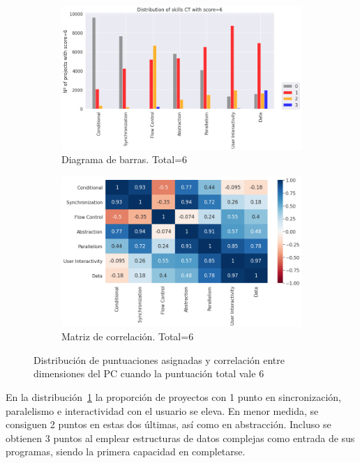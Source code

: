 \documentclass[a4paper, 12pt]{book}
\begin{document}
\begin{figure}[H]
    \centering
    \begin{subfigure}[h]{.49\textwidth} 
        \includegraphics[width=\textwidth]{img/distribucion_6_Snap}
        \caption{Diagrama de barras. Total=6}
        \label{fig:total6_Snap}
    \end{subfigure}       
    \begin{subfigure}[h]{.49\textwidth} 
        \includegraphics[width=\textwidth]{img/corr_6_Snap}
        \caption{Matriz de correlación. Total=6}
        \label{fig:corr6_Snap}
    \end{subfigure}
    \caption{Distribución de puntuaciones asignadas y correlación entre dimensiones del PC cuando la puntuación total vale 6}
\end{figure}

En la distribución~\ref{fig:total6_Snap} la proporción de proyectos con 1 punto en sincronización, paralelismo e interactividad con el usuario se eleva. En menor medida, se consiguen 2 puntos en estas dos últimas, así como en abstracción. Incluso se obtienen 3 puntos al emplear estructuras de datos complejas como entrada de sus programas, siendo la primera capacidad en completarse.
\end{document}
